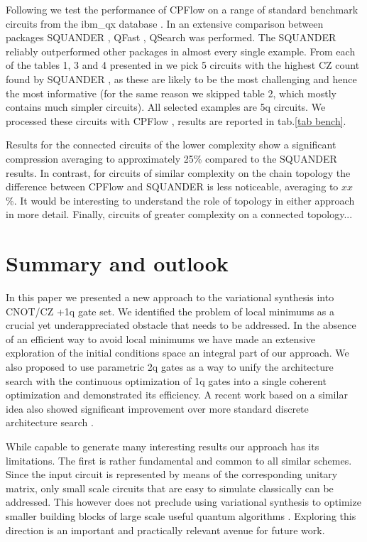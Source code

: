 \documentclass[amsfonts, amssymb, aps, nofootinbib, twocolumn]{revtex4-2}
\newcommand{\CZ}{CZ }
\newcommand{\package}[1]{\textrm {#1 }}
\newcommand{\cpflow}{\package{CPFlow}}
\begin{document}
Following \cite{Rakyta2022} we test the performance of \package{CPFlow} on a range of standard benchmark circuits from the ibm\_qx database \cite{Zulehner2019, ibm_qx}. In \cite{Rakyta2022} an extensive comparison between packages \package{SQUANDER}, \package{QFast}, \package{QSearch} was performed. The \package{SQUANDER} reliably outperformed other packages in almost every single example. From each of the tables 1, 3 and 4 presented in \cite{Rakyta2022} we pick 5 circuits with the highest \CZ count found by \package{SQUANDER}, as these are likely to be the most challenging and hence the most informative (for the same reason we skipped table 2, which mostly contains much simpler circuits). All selected examples are 5q circuits. We processed these circuits with \cpflow, results are reported in tab.\ref{tab bench}.

Results for the connected circuits of the lower complexity show a significant compression averaging to approximately 25\% compared to the \package{SQUANDER} results. In contrast, for circuits of similar complexity on the chain topology the difference between \package{CPFlow} and \package{SQUANDER} is less noticeable, averaging to $xx$\%. It would be interesting to understand the role of topology in either approach in more detail. Finally, circuits of greater complexity on a connected topology...


\section{Summary and outlook \label{sec last}}
In this paper we presented a new approach to the variational synthesis into CNOT/\CZ+1q gate set. We identified the problem of local minimums as a crucial yet underappreciated obstacle that needs to be addressed. In the absence of an efficient way to avoid local minimums we have made an extensive exploration of the initial conditions space an integral part of our approach. We also proposed to use parametric 2q gates as a way to unify the architecture search with the continuous optimization of 1q gates into a single coherent optimization and demonstrated its efficiency. A recent work based on a similar idea \cite{Rakyta2022} also showed significant improvement over more standard discrete architecture search \cite{Smith2021}.

While capable to generate many interesting results our approach has its limitations. The first is rather fundamental and common to all similar schemes. Since the input circuit is represented by means of the corresponding unitary matrix, only small scale circuits that are easy to simulate classically can be addressed. This however does not preclude using variational synthesis to optimize smaller building blocks of large scale useful quantum algorithms \cite{Younis2021}. Exploring this direction is an important and practically relevant avenue for future work.
\end{document}
